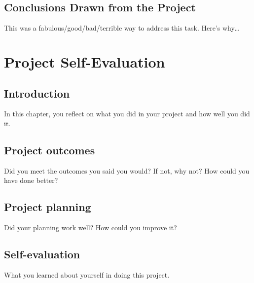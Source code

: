 \documentclass{beamer} %
\begin{document}
\section{Conclusions Drawn from the Project}
This was a fabulous/good/bad/terrible way to address this task. Here's why\ldots

\chapter{Project Self-Evaluation}
\section{Introduction}
In this chapter, you reflect on what you did in your project and how well you did it.
\section{Project outcomes}
Did you meet the outcomes you said you would? If not, why not? How could you have done better?
\section{Project planning}
Did your planning work well? How could you improve it?
\section{Self-evaluation}
What you learned about yourself in doing this project.



\end{document}
